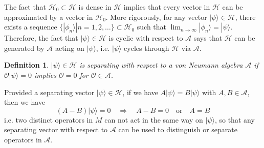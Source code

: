 \documentclass[a4paper,11pt]{article}
\newtheorem{thm}{Theorem}[section]
\newtheorem{defn}[thm]{Definition}
\newcommand{\ket}[1]{| #1 \rangle } %
\renewcommand{\=}[1]{\stackrel{#1}{=}} %
\def\A{\mathcal{A}}
\def\B{\mathcal{B}}
\def\O{\mathcal{O}}
\def\H{\mathcal{H}}
\begin{document}
The fact that $\mathcal{H}_{0}\subset\mathcal{H}$ is dense in $\mathcal{H}$ implies that every vector in $\H$ can be approximated by a vector in $\mathcal{H}_{0}$. More rigorously, for any vector $\ket{\psi}\in\H$, there exists a sequence $\{\ket{\phi_n}|n=1,2,\dots\}\subset\H_0$ such that $\lim_{n\rightarrow\infty}\ket{\phi_n}=\ket{\psi}$. Therefore, the fact that $\ket{\psi}\in\H$ is cyclic with respect to $\A$ says that $\H$ can be generated by $\A$ acting on $\ket{\psi}$, i.e. $\ket{\psi}$ cycles through $\H$ via $\A$.





\begin{defn}
	$\ket{\psi}\in\H$ is separating with respect to a von Neumann algebra $\A$ if $\O\ket{\psi}=0 $ implies $\O=0$ for $\O\in\A$.
\end{defn}

Provided a separating vector $\ket{\psi}\in\H$, if we have $A\ket{\psi}=B\ket{\psi}$ with $A,B\in\A$, then we have
\begin{equation}
	(A-B)\ket{\psi}=0\quad\Rightarrow\quad A-B=0\quad \text{or}\quad A=B
\end{equation}
i.e. two distinct operators in $M$ can not act in the same way on $\ket{\psi}$, so that any separating vector with respect to $\A$ can be used to distinguish or separate operators in $\A$.

%	
%	
%	
\end{document}
